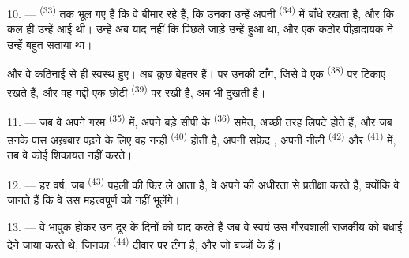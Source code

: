 \VUsaut{4.2mm}
\VUsaut{3.0mm}

10. ---  \textsuperscript{(33)} तक भूल गए हैं कि वे बीमार रहे हैं, कि
उनका  उन्हें अपनी  \textsuperscript{(34)} में
बाँधे रखता है, और कि कल ही उन्हें  आई थी। उन्हें अब
याद नहीं कि पिछले जाड़े उन्हें  हुआ था, और एक कठोर पीड़ादायक
 ने उन्हें बहुत सताया था।

और वे कठिनाई से ही स्वस्थ हुए। अब कुछ बेहतर हैं। पर उनकी टाँग, जिसे वे एक 
\textsuperscript{(38)} पर टिकाए रखते हैं, और वह गद्दी एक छोटी 
\textsuperscript{(39)} पर रखी है, अब भी दुखती है।

11. --- जब वे अपने गरम  \textsuperscript{(35)} में, अपने
बड़े सीपी के  \textsuperscript{(36)} समेत, अच्छी तरह लिपटे होते हैं,
और जब उनके पास अख़बार पढ़ने के लिए वह नन्ही 
\textsuperscript{(40)} होती है, अपनी सफ़ेद , अपनी नीली
 \textsuperscript{(42)} और  \textsuperscript{(41)} में,
तब वे कोई शिकायत नहीं करते।

12. --- हर वर्ष, जब  \textsuperscript{(43)} पहली
 की  फिर ले आता है, वे अपने  की
अधीरता से प्रतीक्षा करते हैं, क्योंकि वे जानते हैं कि वे उस महत्त्वपूर्ण
 को नहीं भूलेंगे।

13. --- वे भावुक होकर उन दूर के दिनों को याद करते हैं जब वे स्वयं उस गौरवशाली
राजकीय  को बधाई देने जाया करते थे, जिनका 
\textsuperscript{(44)} दीवार पर टँगा है, और जो बच्चों के  हैं।
\VUsaut{6.0mm}
\VUfilet{22mm}
